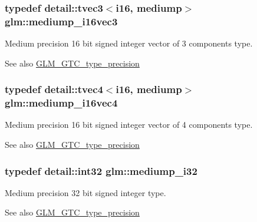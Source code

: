 \subsubsection[{\texorpdfstring{mediump\+\_\+i16vec3}{mediump_i16vec3}}]{\setlength{\rightskip}{0pt plus 5cm}typedef detail\+::tvec3$<$i16, mediump$>$ {\bf glm\+::mediump\+\_\+i16vec3}}\hypertarget{group__gtc__type__precision_gad9e470f707da812fe454505c99035471}{}\label{group__gtc__type__precision_gad9e470f707da812fe454505c99035471}
Medium precision 16 bit signed integer vector of 3 components type. \begin{DoxySeeAlso}{See also}
\hyperlink{group__gtc__type__precision}{G\+L\+M\+\_\+\+G\+T\+C\+\_\+type\+\_\+precision} 
\end{DoxySeeAlso}
\subsubsection[{\texorpdfstring{mediump\+\_\+i16vec4}{mediump_i16vec4}}]{\setlength{\rightskip}{0pt plus 5cm}typedef detail\+::tvec4$<$i16, mediump$>$ {\bf glm\+::mediump\+\_\+i16vec4}}\hypertarget{group__gtc__type__precision_gad9aca299fc3e96c84be6b063381c9f3e}{}\label{group__gtc__type__precision_gad9aca299fc3e96c84be6b063381c9f3e}
Medium precision 16 bit signed integer vector of 4 components type. \begin{DoxySeeAlso}{See also}
\hyperlink{group__gtc__type__precision}{G\+L\+M\+\_\+\+G\+T\+C\+\_\+type\+\_\+precision} 
\end{DoxySeeAlso}
\subsubsection[{\texorpdfstring{mediump\+\_\+i32}{mediump_i32}}]{\setlength{\rightskip}{0pt plus 5cm}typedef detail\+::int32 {\bf glm\+::mediump\+\_\+i32}}\hypertarget{group__gtc__type__precision_ga5e00ec824eb55968a6b6496f294d8c07}{}\label{group__gtc__type__precision_ga5e00ec824eb55968a6b6496f294d8c07}
Medium precision 32 bit signed integer type. \begin{DoxySeeAlso}{See also}
\hyperlink{group__gtc__type__precision}{G\+L\+M\+\_\+\+G\+T\+C\+\_\+type\+\_\+precision} 
\end{DoxySeeAlso}
